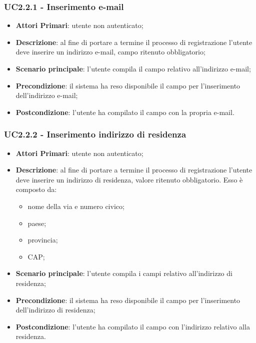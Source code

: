 \subsubsection{UC2.2.1 - Inserimento e-mail}
\begin{itemize}
	\item \textbf{Attori Primari}: utente non autenticato;
	\item \textbf{Descrizione}: al fine di portare a termine il processo di registrazione l'utente deve inserire un indirizzo e-mail, campo ritenuto obbligatorio;
	\item \textbf{Scenario principale}: l'utente compila il campo relativo all'indirizzo e-mail;
	\item \textbf{Precondizione}: il sistema ha reso disponibile il campo per l'inserimento dell'indirizzo e-mail;
	\item \textbf{Postcondizione}: l'utente ha compilato il campo con la propria e-mail.
	
\end{itemize}
\subsubsection{UC2.2.2 - Inserimento indirizzo di residenza}
\begin{itemize}
	\item \textbf{Attori Primari}: utente non autenticato;
	\item \textbf{Descrizione}: al fine di portare a termine il processo di registrazione l'utente deve inserire un indirizzo di residenza, valore ritenuto obbligatorio. Esso è composto da: 
	\begin{itemize}
	\item nome della via e numero civico;
	\item paese;
	\item provincia;
	\item CAP;

	\end{itemize}
	\item \textbf{Scenario principale}: l'utente compila i campi relativo all'indirizzo di residenza;
	\item \textbf{Precondizione}: il sistema ha reso disponibile il campo per l'inserimento dell'indirizzo di residenza;
	\item \textbf{Postcondizione}: l'utente ha compilato il campo con l'indirizzo relativo alla residenza.
\end{itemize}
